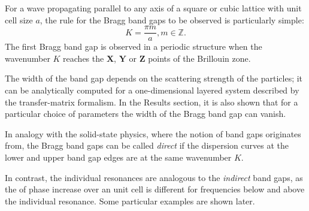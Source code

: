 For a wave propagating parallel to any axis of a square or cubic lattice with unit cell size $a$, the rule for the Bragg band gaps to be observed is particularly simple:
\begin{equation} K= \frac{\pi m}{a}, m\in\mathbb{Z}. \label{eq_braggbg}\end{equation}
The first Bragg band gap is observed in a periodic structure when the wavenumber $K$ reaches the $\mathbf X$, $\mathbf Y$ or $\mathbf Z$ points of the Brillouin zone.

The width of the band gap depends on the scattering strength of the particles; it can be analytically computed for a one-dimensional layered system \cite{laktionov2008} described by the transfer-matrix formalism. 
In the Results section, it is also shown that for a particular choice of parameters the width of the Bragg band gap can vanish. 

In analogy with the solid-state physics, where the notion of band gaps originates from, the Bragg band gaps can be called \textit{direct} if the dispersion curves at the lower and upper band gap edges are at the same wavenumber $K$. 

In contrast, the individual resonances are analogous to the \textit{indirect} band gaps, as the of phase increase over an unit cell is different  for frequencies below and above the individual resonance. Some particular examples are shown later.



